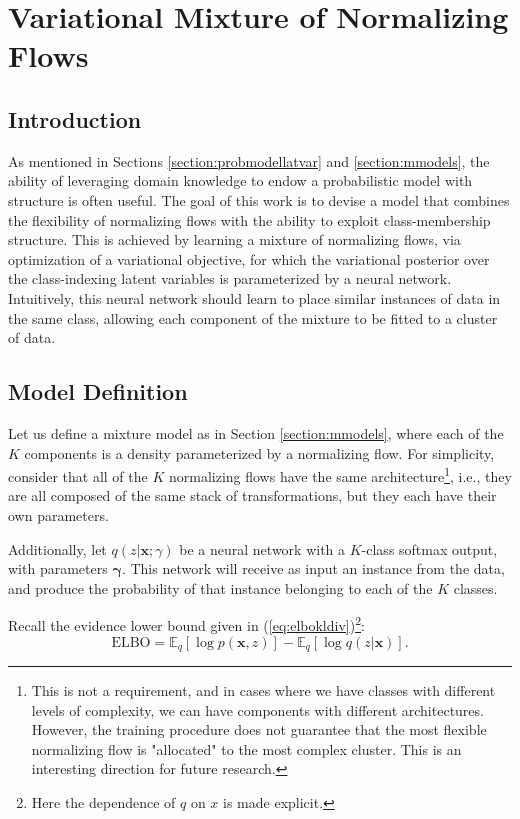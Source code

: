 \chapter{Variational Mixture of Normalizing Flows}
\label{chapter:vmonf}

\section{Introduction}
\label{section:vmonf-intro}

As mentioned in Sections \ref{section:probmodellatvar} and \ref{section:mmodels},
the ability of leveraging domain knowledge to endow a probabilistic model with
structure is often useful. The goal of this work is to devise a model that combines
the flexibility of normalizing flows with the ability to exploit class-membership
structure. This is achieved by learning a mixture of normalizing flows, via
optimization of a variational objective, for which the variational posterior
over the class-indexing latent variables is parameterized by a neural network.
Intuitively, this neural network should learn to place similar instances of
data in the same class, allowing each component of the mixture to be fitted
to a cluster of data.

\section{Model Definition}

Let us define a mixture model as in Section \ref{section:mmodels}, where each of
the $K$ components is a density parameterized by a normalizing flow. For simplicity,
consider that all of the $K$ normalizing flows have the same
architecture\footnote{This is not a requirement,
and in cases where we have classes with different levels of complexity, we can
have components with different architectures. However, the training procedure
does not guarantee that the most flexible normalizing flow is "allocated"
to the most complex cluster. This is an interesting direction for future
research.}, i.e., they are all composed of the same stack of transformations,
but they each have their own parameters.

Additionally, let $q(z|\bm{x};\gamma)$ be a neural network with a $K$-class softmax
output, with parameters $\bm\gamma$. This network will receive as input an instance from the
data, and produce the probability of that instance belonging to each of the
$K$ classes.

Recall the evidence lower bound given in (\ref{eq:elbokldiv})\footnote{Here the
dependence of $q$ on $x$ is made explicit.}:
\begin{equation*}
    \text{ELBO} = \mathbb{E}_q [\log p(\bm{x}, z)] - \mathbb{E}_q [\log q(z|\bm{x})].
\end{equation*}


